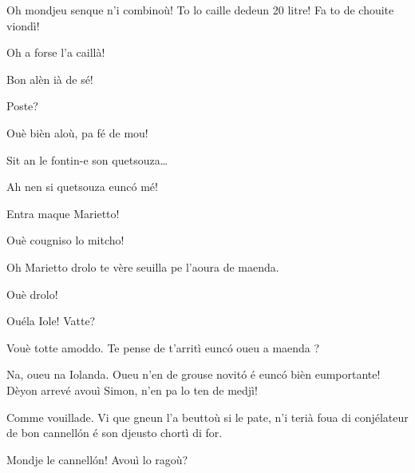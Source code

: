 \begin{drama}
\Sahlammspeaks Oh mondjeu senque n'i combinoù! To lo caille dedeun 20 litre! Fa to de chouite viondì!


\Sahlammspeaks Oh a forse l'a caillà!


\Sahlammspeaks Bon alèn ià de sé!


\Cienspeaks {} Poste?

\Sahlammspeaks Ouè bièn aloù, pa fé de mou!


\Cienspeaks {} Sit an le fontin-e son quetsouza\ldots

\Mariettospeaks Ah nen si quetsouza eunc\'o mé!


\Cienspeaks Entra maque Marietto!

\Mariettospeaks Ouè cougniso lo mitcho!




\Iolandaspeaks Oh Marietto drolo te vère seuilla pe l’aoura de maenda.

\Cienspeaks Ouè drolo!

\Mariettospeaks Ouéla Iole! Vatte?

\Iolandaspeaks Vouè totte amoddo. Te pense de t’arritì eunc\'o oueu a maenda ?


\Cienspeaks Na, oueu na Iolanda. Oueu n’en de grouse novit\'o é eunc\'o bièn eumportante! Dèyon arrevé avouì Simon, n'en pa lo ten de medjì!

\Iolandaspeaks Comme vouillade. Vi que gneun l'a beuttoù si le pate, n’i terià foua di conjélateur  de bon cannell\'on é son djeusto chortì di for.

\Mariettospeaks Mondje le cannell\'on! Avouì lo ragoù?


\end{drama}
